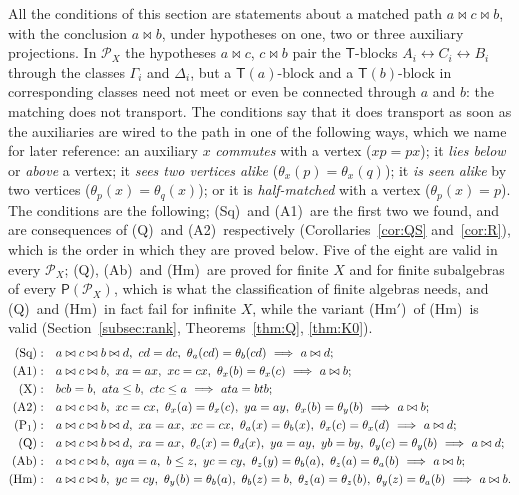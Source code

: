 \documentclass[11pt]{amsart}
\theoremstyle{definition}
\renewcommand{\P}{\mathcal{P}}      %
\newcommand{\PA}{\mathsf{P}}         %
\newcommand{\T}{\mathsf{T}}
\newcommand{\mt}{\bowtie}      %
\newcommand{\Wire}{\textup{(Sq)}}      %
\newcommand{\Rcond}{\textup{(A1)}}     %
\newcommand{\Rp}{\textup{(A2)}}        %
\newcommand{\Vcond}{\textup{(X)}}      %
\newcommand{\Pone}{\textup{(P$_1$)}}
\newcommand{\Qcond}{\textup{(Q)}}
\newcommand{\Kzero}{\textup{(Hm)}}     %
\newcommand{\Hmp}{\textup{(Hm$'$)}}     %
\newcommand{\Kfour}{\textup{(Ab)}}     %
\begin{document}
All the conditions of this section are statements about a matched path $a\mt c\mt b$, with the conclusion $a\mt b$, under hypotheses on one, two or three auxiliary projections. In $\P_X$ the hypotheses $a\mt c$, $c\mt b$ pair the $\T$-blocks $A_i\leftrightarrow C_i\leftrightarrow B_i$ through the classes $\Gamma_i$ and $\Delta_i$, but a $\T(a)$-block and a $\T(b)$-block in corresponding classes need not meet or even be connected through $a$ and $b$: the matching does not transport. The conditions say that it does transport as soon as the auxiliaries are wired to the path in one of the following ways, which we name for later reference: an auxiliary $x$ \emph{commutes} with a vertex ($xp=px$); it \emph{lies below} or \emph{above} a vertex; it \emph{sees two vertices alike} ($\theta_x(p)=\theta_x(q)$); it \emph{is seen alike} by two vertices ($\theta_p(x)=\theta_q(x)$); or it is \emph{half-matched} with a vertex ($\theta_p(x)=p$). The conditions are the following; \Wire\ and \Rcond\ are the first two we found, and are consequences of \Qcond\ and \Rp\ respectively (Corollaries~\ref{cor:QS} and~\ref{cor:R}), which is the order in which they are proved below. Five of the eight are valid in every $\P_X$; \Qcond, \Kfour\ and \Kzero\ are proved for finite $X$ and for finite subalgebras of every $\PA(\P_X)$, which is what the classification of finite algebras needs, and \Qcond\ and \Kzero\ in fact fail for infinite $X$, while the variant \Hmp\ of \Kzero\ is valid (Section~\ref{subsec:rank}, Theorems~\ref{thm:Q}, \ref{thm:K0}).
\begin{align*}
\Wire:\quad& a\mt c\mt b\mt d,\ cd=dc,\ \theta_a(cd)=\theta_b(cd)\ \Longrightarrow\ a\mt d;\\
\Rcond:\quad& a\mt c\mt b,\ xa=ax,\ xc=cx,\ \theta_x(b)=\theta_x(c)\ \Longrightarrow\ a\mt b;\\
\Vcond:\quad& bcb=b,\ ata\le b,\ ctc\le a\ \Longrightarrow\ ata=btb;\\
\Rp:\quad& a\mt c\mt b,\ xc=cx,\ \theta_x(a)=\theta_x(c),\ ya=ay,\ \theta_x(b)=\theta_y(b)\ \Longrightarrow\ a\mt b;\\
\Pone:\quad& a\mt c\mt b\mt d,\ xa=ax,\ xc=cx,\ \theta_a(x)=\theta_b(x),\ \theta_x(c)=\theta_x(d)\ \Longrightarrow\ a\mt d;\\
\Qcond:\quad& a\mt c\mt b\mt d,\ xa=ax,\ \theta_c(x)=\theta_d(x),\ ya=ay,\ yb=by,\ \theta_y(c)=\theta_y(b)\ \Longrightarrow\ a\mt d;\\
\Kfour:\quad& a\mt c\mt b,\ aya=a,\ b\le z,\ yc=cy,\ \theta_z(y)=\theta_b(a),\ \theta_z(a)=\theta_a(b)\ \Longrightarrow\ a\mt b;\\
\Kzero:\quad& a\mt c\mt b,\ yc=cy,\ \theta_y(b)=\theta_b(a),\ \theta_b(z)=b,\ \theta_z(a)=\theta_z(b),\ \theta_y(z)=\theta_a(b)\ \Longrightarrow\ a\mt b.
\end{align*}
\end{document}
